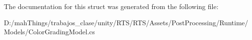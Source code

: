 The documentation for this struct was generated from the following file\+:\begin{DoxyCompactItemize}
\item 
D\+:/mah\+Things/trabajos\+\_\+clase/unity/\+R\+T\+S/\+R\+T\+S/\+Assets/\+Post\+Processing/\+Runtime/\+Models/Color\+Grading\+Model.\+cs\end{DoxyCompactItemize}
